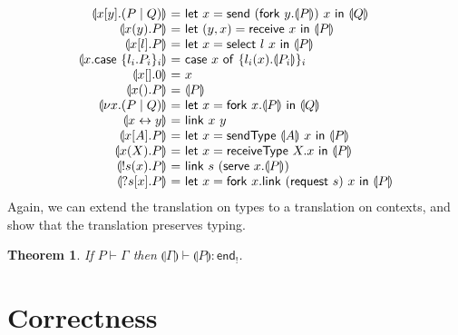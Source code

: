 \documentclass{easychair}
\makeatletter
\newtheorem{theorem}{Theorem}
\newcommand{\ba}{\begin{array}}
\newcommand{\ea}{\end{array}}
\newenvironment{eqs}{\ba{@{}r@{~}c@{~}l@{}}}{\ea}
\newcommand{\key}{\mathsf}
\newcommand{\set}[1]{\{ #1 \}}
\newcommand{\cptogv}[1]{\llparenthesis{#1}\rrparenthesis}
\newcommand{\row}[2]{\set{#1}_{#2}}
\newcommand{\gvEndOutput}{\key{end}_!}
\newcommand{\cpj}[2]{{#1} \vdash {#2}}
\newcommand{\gvj}[3]{{#1} \vdash {#2} : {#3}}
\newcommand{\la}{l}
\newcommand{\G}{\Gamma}
\newcommand{\gvLink}[2]{\key{link}~{#1}~{#2}}
\newcommand{\gvPair}[2]{({#1},{#2})}
\newcommand{\gvLet}[3]{\key{let}~{#1}={#2}~\key{in}~{#3}}
\newcommand{\gvSend}[2]{\key{send}~{#1}~{#2}}
\newcommand{\gvReceive}[1]{\key{receive}~{#1}}
\newcommand{\gvSelect}[2]{\key{select}~{#1}~{#2}}
\newcommand{\gvCase}[2]{\key{case}~{#1}~\key{of}~{#2}}
\newcommand{\gvFork}[2]{\key{fork}~{#1}.{#2}}
\newcommand{\gvTerminate}[1]{\key{terminate}~{#1}}
\newcommand{\gvSendType}[2]{\key{sendType}~{#1}~{#2}}
\newcommand{\gvReceiveType}[2]{\key{receiveType}~{#1}.{#2}}
\newcommand{\gvServe}[2]{\key{serve}~{#1}.{#2}}
\newcommand{\gvRequest}[1]{\key{request}~{#1}}
\newcommand{\cpLink}[2]{{#1} \leftrightarrow {#2}}
\newcommand{\cpCut}[3]{\nu {#1}.({#2} \mid {#3})}
\newcommand{\cpOutput}[4]{{#1}[{#2}].({#3} \mid {#4})}
\newcommand{\cpInput}[3]{{#1}({#2}).{#3}}
\newcommand{\cpInject}[3]{{#1}[{#2}].{#3}}
\newcommand{\cpCase}[2]{{#1}.\key{case}~{#2}}
\newcommand{\cpServe}[3]{!{#1}({#2}).{#3}}
\newcommand{\cpRequest}[3]{?{#1}[{#2}].{#3}}
\newcommand{\cpEmptyOut}[1]{{#1}[].0}
\newcommand{\cpEmptyIn}[2]{{#1}().{#2}}
\newcommand{\cpSendType}[3]{{#1}[{#2}].{#3}}
\newcommand{\cpReceiveType}[3]{{#1}({#2}).{#3}}
\makeatother
\begin{document}
\[
\begin{eqs}
\cptogv{\cpOutput{x}{y}{P}{Q}} &=&
  \gvLet{x}{\gvSend{(\gvFork{y}{\cptogv{P}})}{x}}{\cptogv{Q}} \\
\cptogv{\cpInput{x}{y}{P}} &=&
  \gvLet{\gvPair{y}{x}}{\gvReceive{x}}{\cptogv{P}} \\
\cptogv{\cpInject{x}{\la}{P}} &=&
  \gvLet{x}{\gvSelect{\la}{x}}{\cptogv{P}} \\
\cptogv{\cpCase{x}{\row{\la_i.P_i}{i}}} &=&
  \gvCase{x}{\row{\la_i(x).\cptogv{P_i}}{i}} \\
\cptogv{\cpEmptyOut{x}} &=& x \\
\cptogv{\cpEmptyIn{x}{P}} &=& \cptogv{P} \\
\cptogv{\cpCut{x}{P}{Q}} &=&
  \gvLet{x}{\gvFork{x}{\cptogv{P}}}{\cptogv{Q}} \\
\cptogv{\cpLink{x}{y}} &=& \gvLink{x}{y} \\

\cptogv{\cpSendType{x}{A}{P}} &=&
  \gvLet{x}{\gvSendType{\cptogv{A}}{x}}{\cptogv{P}} \\
\cptogv{\cpReceiveType{x}{X}{P}} &=&
  \gvLet{x}{\gvReceiveType{X}{x}}{\cptogv{P}} \\

\cptogv{\cpServe{s}{x}{P}} &=&
  \gvLink{s}{(\gvServe{x}{\cptogv{P}})} \\
\cptogv{\cpRequest{s}{x}{P}} &=&
  \gvLet{x}{\gvFork{x}{\gvLink{(\gvRequest{s})}{x}}}{\cptogv{P}} \\
\end{eqs}
\]
Again, we can extend the translation on types to a translation on contexts, and show that the
translation preserves typing.
\begin{theorem}
If $\cpj{P}{\G}$ then $\gvj{\cptogv{\G}}{\cptogv{P}}{\gvEndOutput}$.
\end{theorem}


\section{Correctness}
\label{sect:correctness}
\end{document}
